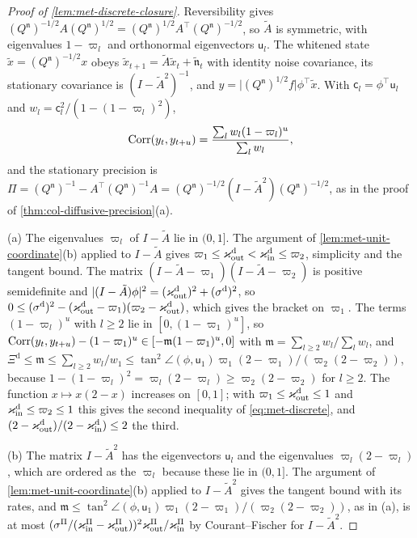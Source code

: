 \begin{proof}[Proof of \cref{lem:met-discrete-closure}]
Reversibility gives $(Q^{\mathfrak n})^{-1/2}A(Q^{\mathfrak n})^{1/2}=(Q^{\mathfrak n})^{1/2}A^\top(Q^{\mathfrak n})^{-1/2}$, so $\tilde A$ is symmetric, with eigenvalues $1-\varpi_l$ and orthonormal eigenvectors $\mathsf u_l$. The whitened state $\tilde x=(Q^{\mathfrak n})^{-1/2}x$ obeys $\tilde x_{t+1}=\tilde A\tilde x_t+\tilde{\mathfrak n}_t$ with identity noise covariance, its stationary covariance is $(I-\tilde A^2)^{-1}$, and $y=\lvert(Q^{\mathfrak n})^{1/2}f\rvert\phi^\top\tilde x$. With $\mathsf c_l=\phi^\top\mathsf u_l$ and $w_l=\mathsf c_l^2/(1-(1-\varpi_l)^2)$,
\[
\operatorname{Corr}(y_t,y_{t+u})=\frac{\sum_lw_l(1-\varpi_l)^u}{\sum_lw_l},
\]
and the stationary precision is $\Pi=(Q^{\mathfrak n})^{-1}-A^\top(Q^{\mathfrak n})^{-1}A=(Q^{\mathfrak n})^{-1/2}(I-\tilde A^2)(Q^{\mathfrak n})^{-1/2}$, as in the proof of \cref{thm:col-diffusive-precision}(a).

(a) The eigenvalues $\varpi_l$ of $I-\tilde A$ lie in $(0,1]$. The argument of \cref{lem:met-unit-coordinate}(b) applied to $I-\tilde A$ gives $\varpi_1\le\varkappa_{\mathrm{out}}^{\mathrm d}<\varkappa_{\mathrm{in}}^{\mathrm d}\le\varpi_2$, simplicity and the tangent bound. The matrix $(I-\tilde A-\varpi_1)(I-\tilde A-\varpi_2)$ is positive semidefinite and $\lvert(I-\tilde A)\phi\rvert^2=(\varkappa_{\mathrm{out}}^{\mathrm d})^2+(\sigma^{\mathrm d})^2$, so $0\le(\sigma^{\mathrm d})^2-(\varkappa_{\mathrm{out}}^{\mathrm d}-\varpi_1)(\varpi_2-\varkappa_{\mathrm{out}}^{\mathrm d})$, which gives the bracket on $\varpi_1$. The terms $(1-\varpi_l)^u$ with $l\ge2$ lie in $[0,(1-\varpi_1)^u]$, so $\operatorname{Corr}(y_t,y_{t+u})-(1-\varpi_1)^u\in[-\mathfrak m(1-\varpi_1)^u,0]$ with $\mathfrak m=\sum_{l\ge2}w_l/\sum_lw_l$, and $\Xi^{\mathrm d}\le\mathfrak m\le\sum_{l\ge2}w_l/w_1\le\tan^2\angle(\phi,\mathsf u_1)\varpi_1(2-\varpi_1)/(\varpi_2(2-\varpi_2))$, because $1-(1-\varpi_l)^2=\varpi_l(2-\varpi_l)\ge\varpi_2(2-\varpi_2)$ for $l\ge2$. The function $x\mapsto x(2-x)$ increases on $[0,1]$; with $\varpi_1\le\varkappa_{\mathrm{out}}^{\mathrm d}\le1$ and $\varkappa_{\mathrm{in}}^{\mathrm d}\le\varpi_2\le1$ this gives the second inequality of \eqref{eq:met-discrete}, and $(2-\varkappa_{\mathrm{out}}^{\mathrm d})/(2-\varkappa_{\mathrm{in}}^{\mathrm d})\le2$ the third.

(b) The matrix $I-\tilde A^2$ has the eigenvectors $\mathsf u_l$ and the eigenvalues $\varpi_l(2-\varpi_l)$, which are ordered as the $\varpi_l$ because these lie in $(0,1]$. The argument of \cref{lem:met-unit-coordinate}(b) applied to $I-\tilde A^2$ gives the tangent bound with its rates, and $\mathfrak m\le\tan^2\angle(\phi,\mathsf u_1)\varpi_1(2-\varpi_1)/(\varpi_2(2-\varpi_2))$, as in (a), is at most $(\sigma^\Pi/(\varkappa_{\mathrm{in}}^\Pi-\varkappa_{\mathrm{out}}^\Pi))^2\varkappa_{\mathrm{out}}^\Pi/\varkappa_{\mathrm{in}}^\Pi$ by Courant--Fischer for $I-\tilde A^2$.


\end{proof}
